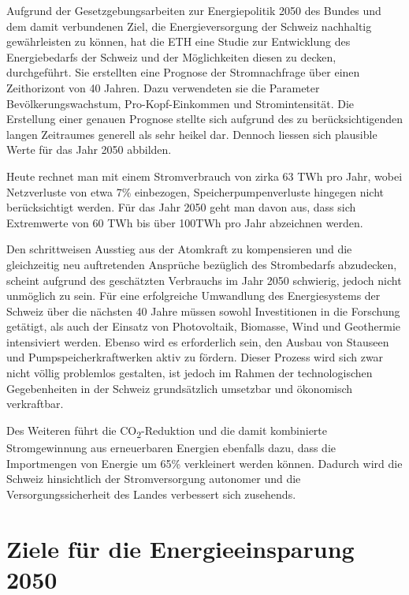 Aufgrund der Gesetzgebungsarbeiten zur Energiepolitik 2050 des Bundes und dem damit verbundenen Ziel, die Energieversorgung der Schweiz nachhaltig gewährleisten zu können, hat die ETH eine Studie zur Entwicklung des Energiebedarfs der Schweiz und der Möglichkeiten diesen zu decken, durchgeführt. Sie erstellten eine Prognose der Stromnachfrage über einen Zeithorizont von 40 Jahren. Dazu verwendeten sie die Parameter Bevölkerungswachstum, Pro-Kopf-Einkommen und Stromintensität. Die Erstellung einer genauen Prognose stellte sich aufgrund des zu berücksichtigenden langen Zeitraumes generell als sehr heikel dar. Dennoch liessen sich plausible Werte für das Jahr 2050 abbilden.
\par
Heute rechnet man mit einem Stromverbrauch von zirka 63 TWh pro Jahr, wobei Netzverluste von etwa 7\% einbezogen, Speicherpumpenverluste hingegen nicht berücksichtigt werden. Für das Jahr 2050 geht man davon aus, dass sich Extremwerte von 60 TWh bis über 100TWh pro Jahr abzeichnen werden.
\par
Den schrittweisen Ausstieg aus der Atomkraft zu kompensieren und die gleichzeitig neu auftretenden Ansprüche bezüglich des Strombedarfs abzudecken, scheint aufgrund des geschätzten Verbrauchs im Jahr 2050 schwierig, jedoch nicht unmöglich zu sein. Für eine erfolgreiche Umwandlung des Energiesystems der Schweiz über die nächsten 40 Jahre müssen sowohl Investitionen in die Forschung getätigt, als auch der Einsatz von Photovoltaik, Biomasse, Wind und Geothermie intensiviert werden.
Ebenso wird es erforderlich sein, den Ausbau von Stauseen und Pumpspeicherkraftwerken aktiv zu fördern. Dieser Prozess wird sich zwar nicht völlig problemlos gestalten, ist jedoch im Rahmen der technologischen Gegebenheiten in der Schweiz grundsätzlich umsetzbar und ökonomisch verkraftbar.
\par
Des Weiteren führt die CO\textsubscript{2}-Reduktion und die damit kombinierte Stromgewinnung aus erneuerbaren Energien ebenfalls dazu, dass die Importmengen von Energie um 65\% verkleinert werden können. Dadurch wird die Schweiz hinsichtlich der Stromversorgung autonomer und die Versorgungssicherheit des Landes verbessert sich zusehends.
 

\section{Ziele für die Energieeinsparung 2050\cite{uvek_energie_schweiz}}

